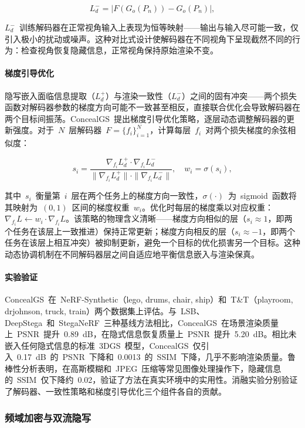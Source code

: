 \begin{equation}
    L_d^- = |F(G_o(P_n)) - G_o(P_n)|,
\end{equation}

$L_d^-$~训练解码器在正常视角输入上表现为恒等映射——输出与输入尽可能一致，仅引入极小的扰动或噪声。这种对比式设计使解码器在不同视角下呈现截然不同的行为：检查视角恢复隐藏信息，正常视角保持原始渲染不变。

\paragraph{梯度引导优化}隐写嵌入面临信息提取（$L_d^+$）与渲染一致性（$L_d^-$）之间的固有冲突——两个损失函数对解码器参数的梯度方向可能不一致甚至相反，直接联合优化会导致解码器在两个目标间振荡。ConcealGS~提出梯度引导优化策略，逐层动态调整解码器的更新强度。对于~$N$~层解码器~$F = \{f_i\}_{i=1}^N$，计算每层~$f_i$~对两个损失梯度的余弦相似度：

\begin{equation}
    s_i = \frac{\nabla_{f_i} L_d^+ \cdot \nabla_{f_i} L_d^-}{\|\nabla_{f_i} L_d^+\| \cdot \|\nabla_{f_i} L_d^-\|}, \quad w_i = \sigma(s_i),
\end{equation}

其中~$s_i$~衡量第~$i$~层在两个任务上的梯度方向一致性，$\sigma(\cdot)$~为~sigmoid~函数将其映射为~$(0, 1)$~区间的梯度权重~$w_i$。优化时每层的梯度乘以对应权重：$\nabla_{f_i} L \leftarrow w_i \cdot \nabla_{f_i} L$。该策略的物理含义清晰——梯度方向相似的层（$s_i \approx 1$，即两个任务在该层上一致推进）保持正常更新；梯度方向相反的层（$s_i \approx -1$，即两个任务在该层上相互冲突）被抑制更新，避免一个目标的优化损害另一个目标。这种动态协调机制在不同解码器层之间自适应地平衡信息嵌入与渲染保真。

\paragraph{实验验证}ConcealGS~在~NeRF-Synthetic（lego, drums, chair, ship）和~T\&T（playroom, drjohnson, truck, train）两个数据集上评估。与~LSB、DeepStega~和~StegaNeRF~三种基线方法相比，ConcealGS~在场景渲染质量上~PSNR~提升~0.89~dB，在隐式信息恢复质量上~PSNR~提升~5.20~dB。相比未嵌入任何隐式信息的标准~3DGS~模型，ConcealGS~仅引入~0.17~dB~的~PSNR~下降和~0.0013~的~SSIM~下降，几乎不影响渲染质量。鲁棒性分析表明，在高斯模糊和~JPEG~压缩等常见图像处理操作下，隐藏信息的~SSIM~仅下降约~0.02，验证了方法在真实环境中的实用性。消融实验分别验证了解码器、一致性策略和梯度引导优化三个组件各自的贡献。

\subsubsection{频域加密与双流隐写}

